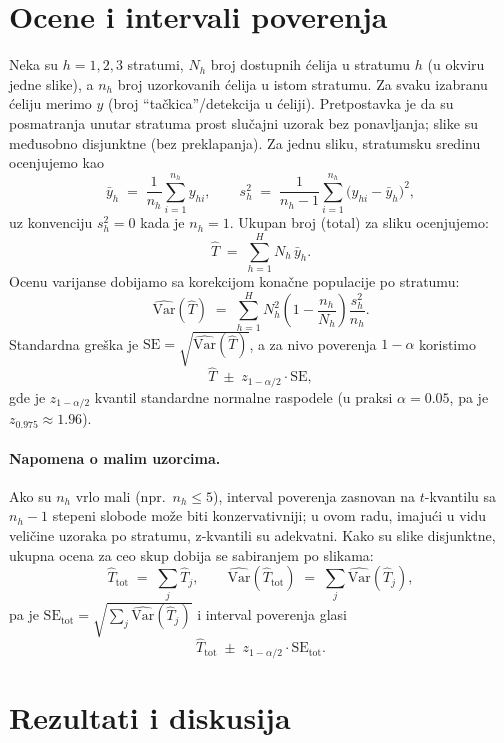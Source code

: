 \documentclass[a4paper,12pt]{article}
\begin{document}
\section{Ocene i intervali poverenja}

Neka su $h=1,2,3$ stratumi, $N_h$ broj dostupnih ćelija u stratumu $h$ (u okviru jedne slike), a $n_h$ broj uzorkovanih ćelija u istom stratumu. 
Za svaku izabranu ćeliju merimo $y$ (broj ``tačkica''/detekcija u ćeliji). Pretpostavka je da su posmatranja unutar stratuma prost slučajni uzorak bez ponavljanja; slike su međusobno disjunktne (bez preklapanja).
\newline
\newline
\noindent
Za jednu sliku, stratumsku sredinu ocenjujemo kao
\[
\bar y_h \;=\; \frac{1}{n_h}\sum_{i=1}^{n_h} y_{hi}, 
\qquad
s_h^2 \;=\; \frac{1}{n_h-1}\sum_{i=1}^{n_h}\bigl(y_{hi}-\bar y_h\bigr)^2,
\]
uz konvenciju $s_h^2=0$ kada je $n_h=1$.
Ukupan broj (total) za sliku ocenjujemo:
\[
\hat T \;=\; \sum_{h=1}^H N_h\,\bar y_h.
\]
Ocenu varijanse dobijamo sa korekcijom konačne populacije po stratumu:
\[
\widehat{\mathrm{Var}}(\hat T) \;=\; \sum_{h=1}^H 
N_h^2 \left(1-\frac{n_h}{N_h}\right)\frac{s_h^2}{n_h}.
\]
Standardna greška je $\mathrm{SE}=\sqrt{\widehat{\mathrm{Var}}(\hat T)}$, a za nivo poverenja $1-\alpha$ koristimo
\[
\hat T \;\pm\; z_{1-\alpha/2}\cdot \mathrm{SE},
\]
gde je $z_{1-\alpha/2}$ kvantil standardne normalne raspodele (u praksi $\alpha=0{.}05$, pa je $z_{0{.}975}\approx 1{.}96$).

\paragraph{Napomena o malim uzorcima.}
Ako su $n_h$ vrlo mali (npr.\ $n_h\le 5$), interval poverenja zasnovan na $t$-kvantilu sa $n_h-1$ stepeni slobode može biti konzervativniji; u ovom radu, imajući u vidu veličine uzoraka po stratumu, z-kvantili su adekvatni.
\newline
\newline
\noindent
Kako su slike disjunktne, ukupna ocena za ceo skup dobija se sabiranjem po slikama:
\[
\hat T_{\mathrm{tot}} \;=\; \sum_{j} \hat T_j,
\qquad
\widehat{\mathrm{Var}}(\hat T_{\mathrm{tot}}) \;=\; \sum_{j} \widehat{\mathrm{Var}}(\hat T_j),
\]
pa je $\mathrm{SE}_{\mathrm{tot}}=\sqrt{\sum_j \widehat{\mathrm{Var}}(\hat T_j)}$ i interval poverenja glasi
\[
\hat T_{\mathrm{tot}} \;\pm\; z_{1-\alpha/2}\cdot \mathrm{SE}_{\mathrm{tot}}.
\]

\newpage
\section{Rezultati i diskusija}
\end{document}

